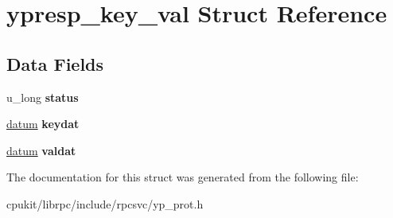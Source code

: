 \hypertarget{structypresp__key__val}{}\section{ypresp\+\_\+key\+\_\+val Struct Reference}
\label{structypresp__key__val}
\subsection*{Data Fields}
\begin{DoxyCompactItemize}
\item 
\mbox{\label{structypresp__key__val_aaff83aa5411f0dfd337a1923f92403ad}} 
u\+\_\+long {\bfseries status}
\item 
\mbox{\label{structypresp__key__val_a71620d756e958f6a3b1fe23874ace34b}} 
\mbox{\hyperlink{structdatum}{datum}} {\bfseries keydat}
\item 
\mbox{\label{structypresp__key__val_ae2d98dea1839ab8ce73e29b67de393bb}} 
\mbox{\hyperlink{structdatum}{datum}} {\bfseries valdat}
\end{DoxyCompactItemize}


The documentation for this struct was generated from the following file\+:\begin{DoxyCompactItemize}
\item 
cpukit/librpc/include/rpcsvc/yp\+\_\+prot.\+h\end{DoxyCompactItemize}
